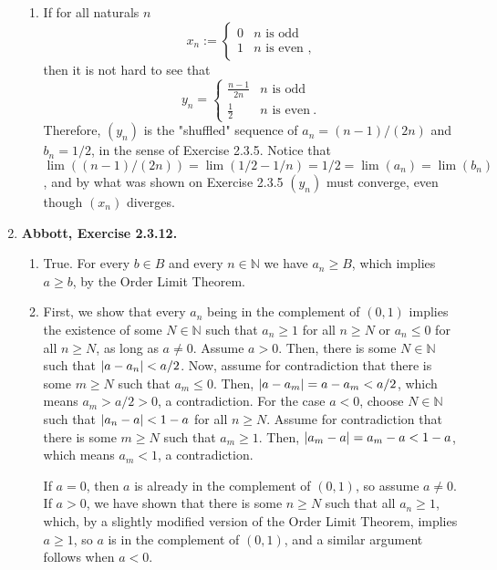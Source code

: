 \documentclass{article}
\DeclarePairedDelimiter\abs{\lvert}{\rvert}
\newcommand{\N}{\mathbb{N}}
\newcommand{\exc}[2][Abbott]{\item \textbf{#1, Exercise #2.}}
\begin{document}
\begin{enumerate}
\begin{enumerate}
		\item If for all naturals $n$ \begin{equation*}
		      x_n := \begin{cases}
		      0 & n \text{ is odd} \\
		      1 & n \text{ is even} \text{ ,}
		\end{cases}
		\end{equation*} then it is not hard to see that \begin{equation*}
		y_n = \begin{cases}
		\frac{n-1}{2n} & n \text{ is odd} \\
		\frac{1}{2} & n \text{ is even} ~ .
		\end{cases}
		\end{equation*} Therefore, $(y_n)$ is the "shuffled" sequence of $a_n = (n-1)/(2n)$ and $b_n = 1/2$, in the sense of Exercise 2.3.5. Notice that $\lim((n-1)/(2n)) = \lim(1/2 - 1/n) = 1/2 = \lim(a_n) = \lim(b_n)$, and by what was shown on Exercise 2.3.5 $(y_n)$ must converge, even though $(x_n)$ diverges.
	\end{enumerate}
				 
	\exc{2.3.12}
				 
	\begin{enumerate}
		\item True. For every $b \in B$ and every $n \in \N$ we have $a_n \geq B$, which implies $a \geq b$, by the Order Limit Theorem.
		      		      		      	     
		\item First, we show that every $a_n$ being in the complement of $(0, 1)$ implies the existence of some $N \in \N$ such that $a_n \geq 1$ for all $n \geq N$ or $a_n \leq 0$ for all $n \geq N$, as long as $a \neq 0$. Assume $a > 0$. Then, there is some $N \in \N$ such that $\abs*{a-a_n} < a/2$. Now, assume for contradiction that there is some $m \geq N$ such that $a_m \leq 0$. Then, $\abs*{a-a_m} = a-a_m < a/2$, which means $a_m > a/2 > 0$, a contradiction. For the case $a < 0$, choose $N \in \N$ such that $\abs*{a_n-a} < 1-a$ for all $n \geq N$. Assume for contradiction that there is some $m \geq N$ such that $a_m \geq 1$. Then, $\abs*{a_m-a} = a_m-a < 1-a$, which means $a_m < 1$, a contradiction. 
		      		      		      	     
		      If $a = 0$, then $a$ is already in the complement of $(0, 1)$, so assume $a \neq 0$. If $a > 0$, we have shown that there is some $n \geq N$ such that all $a_n \geq 1$, which, by a slightly modified version of the Order Limit Theorem, implies $a \geq 1$, so $a$ is in the complement of $(0, 1)$, and a similar argument follows when $a < 0$.
		      		      		      	     

\end{enumerate}
\end{enumerate}
\end{document}
